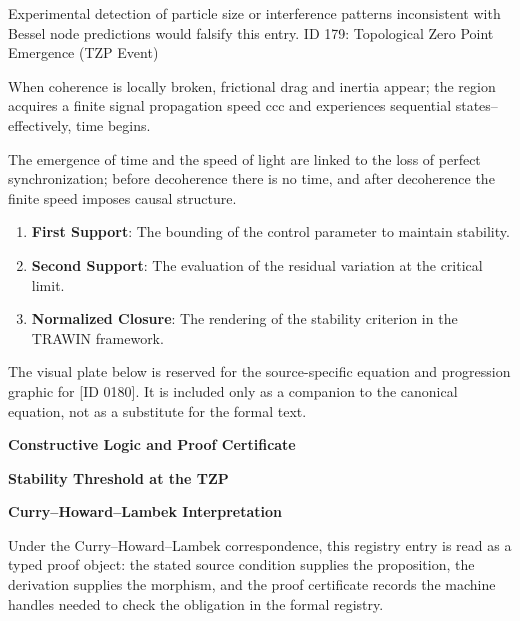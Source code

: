 Experimental detection of particle size or interference patterns inconsistent with Bessel node predictions would falsify this entry. ID 179: Topological Zero Point Emergence (TZP Event)  

When coherence is locally broken, frictional drag and inertia appear; the region acquires a finite signal propagation speed ccc and experiences sequential states--effectively, time begins.

The emergence of time and the speed of light are linked to the loss of perfect synchronization; before decoherence there is no time, and after decoherence the finite speed imposes causal structure.  
\endgroup

\begin{enumerate}[leftmargin=1.6em,itemsep=6pt,topsep=4pt]
\item \textbf{First Support}: The bounding of the control parameter to maintain stability.
\item \textbf{Second Support}: The evaluation of the residual variation at the critical limit.
\item \textbf{Normalized Closure}: The rendering of the stability criterion in the TRAWIN framework.
\end{enumerate}

\begingroup\footnotesize\sloppy
The visual plate below is reserved for the source-specific equation and progression graphic for [ID 0180]. It is included only as a companion to the canonical equation, not as a substitute for the formal text.
\par\endgroup
\ifTZPDarkEdition
{}
\fi

\clearpage
\begingroup\tzpsupportsetup
\noindent\textbf{\fontsize{10.8pt}{12.8pt}\selectfont [ID 0180] Constructive Logic and Proof Certificate}\par
\noindent\textbf{\fontsize{10pt}{12pt}\selectfont Stability Threshold at the TZP}\par
\vspace{0.45em}
\begingroup
\footnotesize
\setlength{\parskip}{0.22em}
\setlength{\parindent}{0pt}
\noindent\textbf{Curry--Howard--Lambek Interpretation}\par
Under the Curry--Howard--Lambek correspondence, this registry entry is read as a typed proof
object: the stated source condition supplies the proposition, the derivation supplies the
morphism, and the proof certificate records the machine handles needed to check the obligation
in the formal registry.

